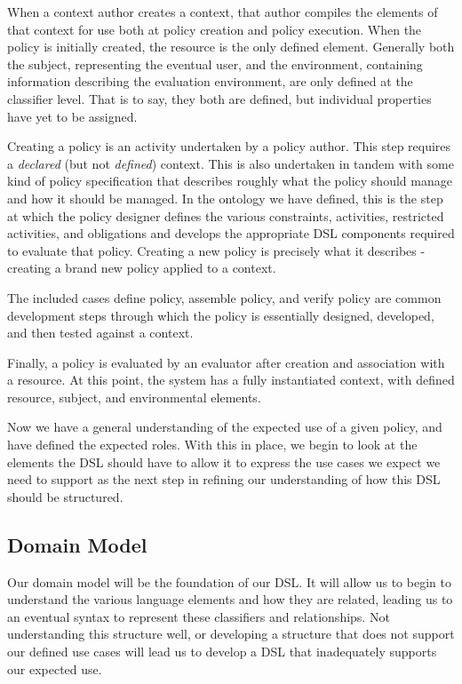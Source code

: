 When a context author creates a context, that author compiles the elements of that context for use both at policy creation and policy execution.  When the policy is initially created, the resource is the only defined element.  Generally both the subject, representing the eventual user, and the environment, containing information describing the evaluation environment, are only defined at the classifier level.  That is to say, they both are defined, but individual properties have yet to be assigned.

Creating a policy is an activity undertaken by a policy author.  This step requires a \emph{declared} (but not \emph{defined}) context.  This is also undertaken in tandem with some kind of policy specification that describes roughly what the policy should manage and how it should be managed.  In the ontology we have defined, this is the step at which the policy designer defines the various constraints, activities, restricted activities, and obligations and develops the appropriate DSL components required to evaluate that policy.  Creating a new policy is precisely what it describes - creating a brand new policy applied to a context.

The included cases define policy, assemble policy, and verify policy are common development steps through which the policy is essentially designed, developed, and then tested against a context.

Finally, a policy is evaluated by an evaluator after creation and association with a resource.  At this point, the system has a fully instantiated context, with defined resource, subject, and environmental elements.

Now we have a general understanding of the expected use of a given policy, and have defined the expected roles.  With this in place, we begin to look at the elements the DSL should have to allow it to express the use cases we expect we need to support as the next step in refining our understanding of how this DSL should be structured.

\subsection{Domain Model}
Our domain model will be the foundation of our DSL.  It will allow us to begin to understand the various language elements and how they are related, leading us to an eventual syntax to represent these classifiers and relationships.  Not understanding this structure well, or developing a structure that does not support our defined use cases will lead us to develop a DSL that inadequately supports our expected use.

